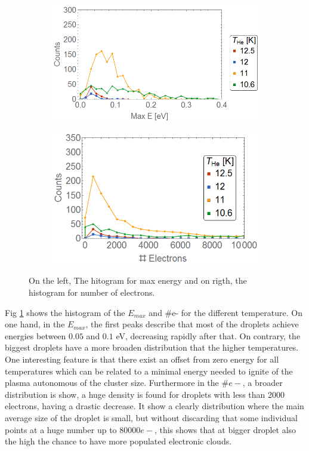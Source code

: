 \begin{figure}[h!]
\centering
\begin{subfigure}[l]{0.49\textwidth}
\includegraphics[width=1\textwidth]{../Images/results/Mir_He_Dropletsize/Henerg.png}   				\end{subfigure}
\begin{subfigure}[l]{0.49\textwidth}
\includegraphics[width=1\textwidth]{../Images/results/Mir_He_Dropletsize/Helec.png} 
\end{subfigure}
\caption[MIR He droplet scan histograms]{On the left, The hitogram for max energy and on rigth, the histogram for number of electrons.}
\label{fig:histodropletsize}
\end{figure}

Fig \ref{fig:histodropletsize} shows the histogram of the $E_{max}$ and  $\#$e- for the different temperature. On one hand, in the $E_{max}$, the first peaks describe that most of the droplets achieve energies between $0.05$ and $0.1$ eV, decreasing rapidly after that. On contrary, the biggest droplets have a more broaden distribution that the higher temperatures. One interesting feature is that there exist an offset from zero energy for all temperatures which can be related to a minimal energy needed to ignite of the plasma autonomous of the cluster size.  Furthermore in the $\#e-$, a broader distribution is show, a huge density is found for droplets with less than 2000 electrons, having a drastic decrease. It show a clearly distribution where the main average size of the droplet is small,  but without discarding that some individual points at a huge number up to 80000$e-$, this shows that at bigger droplet also the high the chance to have more populated electronic clouds.



